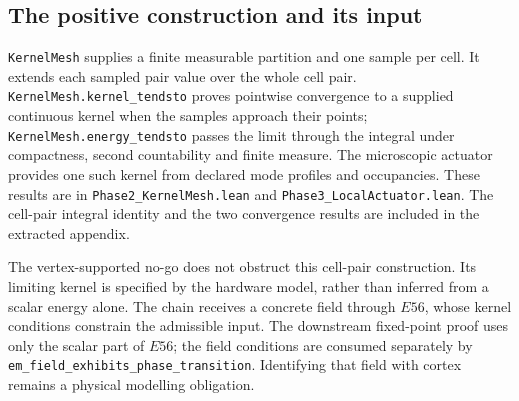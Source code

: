 \subsection{The positive construction and its input}
\texttt{KernelMesh} supplies a finite measurable partition and one sample per
cell. It extends each sampled pair value over the whole cell pair.
\texttt{KernelMesh.kernel\_tendsto} proves pointwise convergence to a supplied
continuous kernel when the samples approach their points;
\texttt{KernelMesh.energy\_tendsto} passes the limit through the integral under
compactness, second countability and finite measure. The microscopic actuator
provides one such kernel from declared mode profiles and occupancies. These
results are in \nolinkurl{Phase2_KernelMesh.lean} and
\nolinkurl{Phase3_LocalActuator.lean}. The cell-pair integral identity and the
two convergence results are included in the extracted appendix.

\scope The vertex-supported no-go does not obstruct this cell-pair construction.
Its limiting kernel is specified by the hardware model, rather than inferred
from a scalar energy alone. The chain receives a concrete field through $E56$,
whose kernel conditions constrain the admissible input. The downstream
fixed-point proof uses only the scalar part of $E56$; the field conditions are
consumed separately by \texttt{em\_field\_exhibits\_phase\_transition}.
Identifying that field with cortex remains a physical modelling obligation.
